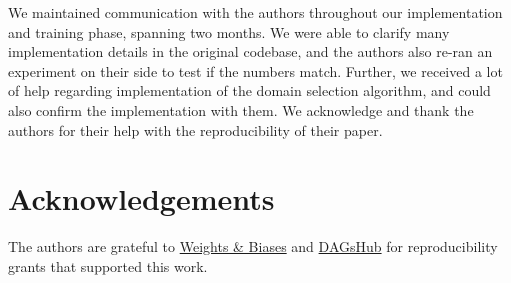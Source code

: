 We maintained communication with the authors throughout our implementation and training phase, spanning two months. We were able to clarify many implementation details in the original codebase, and the authors also re-ran an experiment on their side to test if the numbers match. Further, we received a lot of help regarding implementation of the domain selection algorithm, and could also confirm the implementation with them. We acknowledge and thank the authors for their help with the reproducibility of their paper.

\section{Acknowledgements}

The authors are grateful to \href{https://wandb.ai/}{Weights \& Biases} and \href{https://dagshub.com/}{DAGsHub} for reproducibility grants that supported this work.

\newpage
